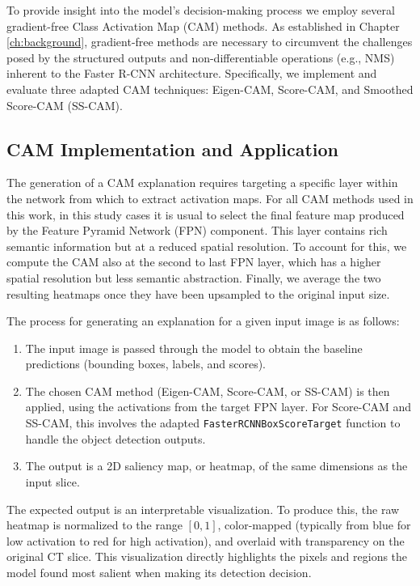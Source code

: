To provide insight into the model's decision-making process we employ several gradient-free Class Activation Map (CAM) methods. As established in Chapter \ref{ch:background}, gradient-free methods are necessary to circumvent the challenges posed by the structured outputs and non-differentiable operations (e.g., NMS) inherent to the Faster R-CNN architecture. Specifically, we implement and evaluate three adapted CAM techniques: Eigen-CAM, Score-CAM, and Smoothed Score-CAM (SS-CAM).

\subsection{CAM Implementation and Application}
\label{subsec:cam_implementation}

The generation of a CAM explanation requires targeting a specific layer within the network from which to extract activation maps. For all CAM methods used in this work, in this study cases it is usual to select the final feature map produced by the Feature Pyramid Network (FPN) component. This layer contains rich semantic information but at a reduced spatial resolution. To account for this, we compute the CAM also at the second to last FPN layer, which has a higher spatial resolution but less semantic abstraction. 
Finally, we average the two resulting heatmaps once they have been upsampled to the original input size.

The process for generating an explanation for a given input image is as follows:
\begin{enumerate}
    \item The input image is passed through the model to obtain the baseline predictions (bounding boxes, labels, and scores).
    \item The chosen CAM method (Eigen-CAM, Score-CAM, or SS-CAM) is then applied, using the activations from the target FPN layer. For Score-CAM and SS-CAM, this involves the adapted \texttt{FasterRCNNBoxScoreTarget} function to handle the object detection outputs.
    \item The output is a 2D saliency map, or heatmap, of the same dimensions as the input slice.
\end{enumerate}

The expected output is an interpretable visualization. To produce this, the raw heatmap is normalized to the range $[0, 1]$, color-mapped (typically from blue for low activation to red for high activation), and overlaid with transparency on the original CT slice. This visualization directly highlights the pixels and regions the model found most salient when making its detection decision.


